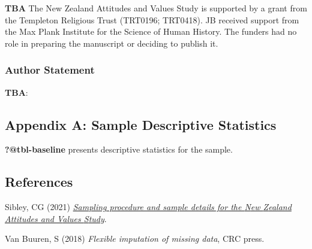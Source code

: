 \documentclass[
  single column]{article}
\newlength{\cslhangindent}
\newenvironment{CSLReferences}[2] %
 {\begin{list}{}{%
  \setlength{\itemindent}{0pt}
  \setlength{\leftmargin}{0pt}
  \setlength{\parsep}{0pt}
  \ifodd #1
   \setlength{\leftmargin}{\cslhangindent}
   \setlength{\itemindent}{-1\cslhangindent}
  \fi
  \setlength{\itemsep}{#2\baselineskip}}}
 {\end{list}}
\begin{document}
\textbf{TBA} The New Zealand Attitudes and Values Study is supported by
a grant from the Templeton Religious Trust (TRT0196; TRT0418). JB
received support from the Max Plank Institute for the Science of Human
History. The funders had no role in preparing the manuscript or deciding
to publish it.

\subsubsection{Author Statement}\label{author-statement}

\textbf{TBA}:

\newpage{}

\subsection{Appendix A: Sample Descriptive Statistics}\label{appendix-a}

\textbf{?@tbl-baseline} presents descriptive statistics for the sample.

\subsection*{References}\label{references}

\label{refs}
\begin{CSLReferences}{1}{0}
Sibley, CG (2021)
\emph{\href{https://doi.org/10.31234/osf.io/wgqvy}{Sampling procedure
and sample details for the {N}ew {Z}ealand {A}ttitudes and {V}alues
{S}tudy}}.

Van Buuren, S (2018) \emph{Flexible imputation of missing data}, CRC
press.

\end{CSLReferences}
\end{document}
